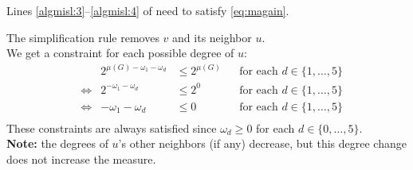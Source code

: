 \begin{frame}

 Lines \ref{algmisl:3}--\ref{algmisl:4} of \algmis need to satisfy \eqref{eq:magain}.
 
 The simplification rule removes $v$ and its neighbor $u$.\\
 We get a constraint for each possible degree of $u$:\\
 \begin{align*}
	 &&2^{\mu(G)-\omega_1-\omega_d} &\le 2^{\mu(G)} && \text{for each }d\in \{1,\dots,5\}\\
	 &\Leftrightarrow& 2^{-\omega_1-\omega_d} &\le 2^{0} && \text{for each }d\in \{1,\dots,5\}\\
	 &\Leftrightarrow& -\omega_1-\omega_d &\le 0 && \text{for each }d\in \{1,\dots,5\}\\
 \end{align*}
 These constraints are always satisfied since $\omega_d\ge 0$ for each $d\in\{0,\dots,5\}$.\\
 \textbf{Note:} the degrees of $u$'s other neighbors (if any) decrease, but this degree change does not increase the measure.

\end{frame}


